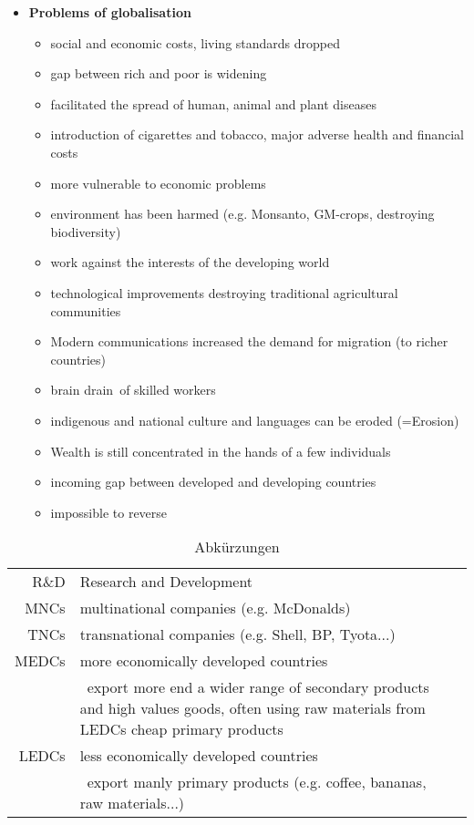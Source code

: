 \documentclass[a5paper,12pt,twoside,titlepage]{scrartcl}
\begin{document}
\begin{itemize}
	\item \textbf{Problems of globalisation}
	\begin{itemize}
		\item social and economic costs, living standards dropped
		\item gap between rich and poor is widening
		\item facilitated the spread of human, animal and plant diseases
		\item introduction of cigarettes and tobacco, major adverse health and financial costs
		\item more vulnerable to economic problems
		\item environment has been harmed (e.g. Monsanto, GM-crops, destroying biodiversity)
		\item work against the interests of the developing world
		\item technological improvements destroying traditional agricultural communities
		\item Modern communications increased the demand for migration (to richer countries) 
		\item \glq brain drain\grq\ of skilled workers
		\item indigenous and national culture and languages can be eroded (\textrightarrow=Erosion)
		\item Wealth is still concentrated in the hands of a few individuals
		\item incoming gap between developed and developing countries
		\item impossible to reverse
	\end{itemize}
\end{itemize}


\begin{table}[h!]
	\caption{Abkürzungen}
	\begin{tabular}{r|p{}l}
		R\&D & Research and Development \\
		MNCs & multinational companies (e.g. McDonalds) \\
		TNCs & transnational companies (e.g. Shell, BP, Tyota...) \\
		MEDCs & more economically developed countries \\
		          & \textrightarrow\ export more end a wider range of secondary products and high values goods, often using raw materials from LEDCs \textrightarrow cheap primary products \\
		LEDCs & less economically developed countries \\
				& \textrightarrow\ export manly primary products (e.g. coffee, bananas, raw materials...)
		
	\end{tabular}
\end{table}
\end{document}
